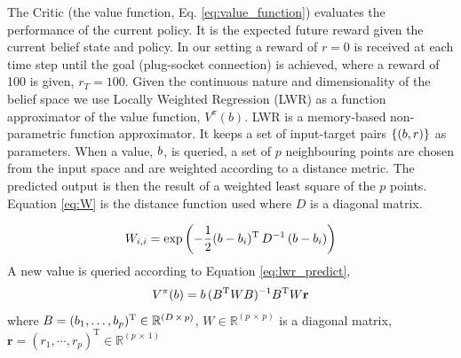 

% 
%


The Critic (the value function, Eq. \ref{eq:value_function}) evaluates 
the performance of the current policy. It is the expected future reward given the current 
belief state and policy.
In our setting a reward of $r=0$ is received at each time step
until the goal (plug-socket connection) is achieved, where a reward of 100 is given, $r_{T}=100$.
Given the continuous nature and dimensionality of the belief space we use Locally Weighted Regression \cite{Atkeson97locallyweighted}
(LWR) as a function approximator of the value function, $V^{\pi}(b)$. LWR is a memory-based non-parametric function 
approximator. It keeps a set of input-target pairs $\{(b,r)\}$ as parameters. When a value, $b$, is 
queried, a set of $p$ neighbouring points are chosen from the input space and are 
weighted according to a distance metric. The predicted output is then the result of a weighted 
least square of the $p$ points. Equation \ref{eq:W} is the distance function used where 
$D$ is a diagonal matrix.

\begin{equation}\label{eq:W}
 W_{i,i}  = \exp\left(-\frac{1}{2}(b - b_i)^{\mathrm{T}}\, D^{-1} \, (b - b_i) \right)
\end{equation}
A new value is queried according to Equation \ref{eq:lwr_predict},
\begin{equation}\label{eq:lwr_predict}
  V^{\pi}(b) = b \,(B^{\mathrm{T}} W B)^{-1} B^{\mathrm{T}} W \mathbf{r}
\end{equation}
where $B = (b_1,\dots,b_p)^{\mathrm{T}} \in \mathbb{R}^{(D\, \times\, p)}$, $W \in \mathbb{R}^{(p\, \times\, p)}$ is
a diagonal matrix, $\mathbf{r} = (r_1,\cdots,r_p)^{\mathrm{T}} \in \mathbb{R}^{(p\, \times\, 1)}$

